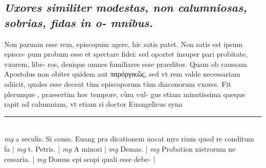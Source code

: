 \documentclass{article}
\begin{document}
\begin{pages}
\subsection*{\textit{Uxores similiter modestas, non calumniosas, sobrias, fidas in o- mnibus. }}\pstart Non paruam esse rem, episcopum agere, hic satis patet. Non satis est ipsum episco- pum probum esse et spectare fidei: sed oportet insuper pari probitate, vxorem, libe- ros, denique omnes familiares esse praeditos. Quam ob caussam Apostolus non obiter quidem aut παρόργικῶς, sed vt rem valde necessariam adiicit, quales esse deceat tùm episcoporum tùm diaconorum vxores. Fit plerunque , praesertim hoc tempore, cùm vul- gus etiam minutissima queque rapit ad calumniam, vt etiam si doctor Euangelicus syna  \pend
\vspace{0.5cm}\noindent
\vspace{0.2cm}\rule{1cm}{0.2pt}\\ 
\hspace{0.2cm}\textit{mg}
\footnotesize a seculis. Si couss. Euang pra dicationem uocat mys rium quod re conditum fa 
\normalsize| 
\hspace{0.2cm}\textit{mg}
\footnotesize t. Petris. 
\normalsize| 
\hspace{0.2cm}\textit{mg}
\footnotesize A minori 
\normalsize| 
\hspace{0.2cm}\textit{mg}
\footnotesize Demas. 
\normalsize| 
\hspace{0.2cm}\textit{mg}
\footnotesize Probation nistrorum ne cessaria. 
\normalsize| 
\hspace{0.2cm}\textit{mg}
\footnotesize Domus epi scopi quali esse debe- 
\normalsize| 

\end{pages}
\end{document}
